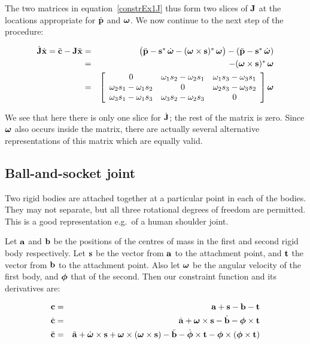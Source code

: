 The two matrices in equation~\ref{constrEx1J} thus form two slices of $\m{J}$ at
the locations appropriate for $\dot{\ve{p}}$ and $\ve{\omega}$. We now continue to the
next step of the procedure:

\begin{eqnarray}
\dot{\m{J}}\dot{\ve{x}} = 
\ddot{\ve{c}} - \m{J}\ddot{\ve{x}} &=&
    \big(\ddot{\ve{p}} - \dual{\ve{s}}\,\dot{\ve{\omega}} -
    \dual{(\ve{\omega}\times\ve{s})}\,\ve{\omega}\big) -
    (\ddot{\ve{p}} - \dual{\ve{s}}\,\dot{\ve{\omega}}) \nonumber\\
& = & -\dual{(\ve{\omega}\times\ve{s})}\,\ve{\omega} \nonumber\\
& = & \left[\begin{array}{ccc} 0 &
    \omega_1 s_2 - \omega_2 s_1 &
    \omega_1 s_3 - \omega_3 s_1 \\
    \omega_2 s_1 - \omega_1 s_2 & 0 &
    \omega_2 s_3 - \omega_3 s_2 \\
    \omega_3 s_1 - \omega_1 s_3 &
    \omega_3 s_2 - \omega_2 s_3 & 0
    \end{array}\right] \ve{\omega} \nonumber\\\label{constrEx1JDot}
\end{eqnarray}

We see that here there is only one slice for $\dot{\m{J}}$; the rest of the matrix
is zero. Since $\ve{\omega}$ also occurs inside the matrix, there are actually several
alternative representations of this matrix which are equally valid.

\subsection{Ball-and-socket joint\label{constrJoint}}

Two rigid bodies are attached together at a particular point in each of the bodies.
They may not separate, but all three rotational degrees of freedom are permitted. This is
a good representation e.g.\ of a human shoulder joint.

Let $\ve{a}$ and $\ve{b}$ be the positions of the centres of mass in the first and
second rigid body respectively. Let $\ve{s}$ be the vector from $\ve{a}$ to the 
attachment point, and $\ve{t}$ the vector from $\ve{b}$ to the attachment point.
Also let $\ve{\omega}$ be the angular velocity of the first body, and $\ve{\phi}$ that
of the second. Then our constraint function and its derivatives are:

\begin{eqnarray}
\ve{c} &=& \ve{a} + \ve{s} - \ve{b} - \ve{t} \\
\dot{\ve{c}} &=& \dot{\ve{a}} + \ve{\omega}\times\ve{s} -
    \dot{\ve{b}} - \ve{\phi}\times\ve{t} \\
\ddot{\ve{c}} &=& \ddot{\ve{a}} + \dot{\ve{\omega}}\times\ve{s} +
    \ve{\omega}\times(\ve{\omega}\times\ve{s}) -
    \ddot{\ve{b}} - \dot{\ve{\phi}}\times\ve{t} -
    \ve{\phi}\times(\ve{\phi}\times\ve{t})
\end{eqnarray}

